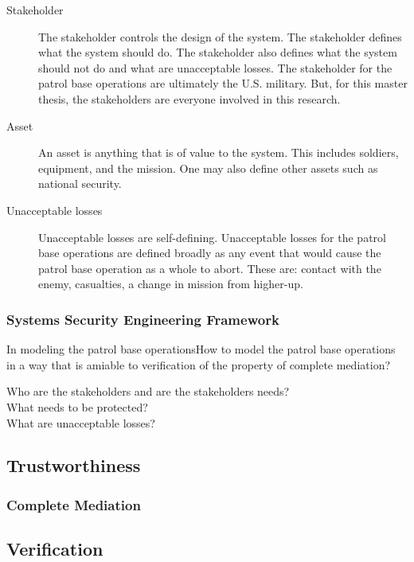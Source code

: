 \documentclass[../../main/main.tex]{subfiles}
\begin{document}
\begin{description}
\item[ Stakeholder]  The stakeholder controls the design of the system.  The stakeholder defines what the system should do.  The stakeholder also defines what the system should not do and what are unacceptable losses.  The stakeholder for the patrol base operations are ultimately the U.S. military.  But, for this master thesis, the stakeholders are everyone involved in this research.  
\item[Asset] An asset is anything that is of value to the system.   This includes soldiers, equipment, and the mission.   One may also define other assets such as national security. 
\item[Unacceptable losses] Unacceptable losses are self-defining.  Unacceptable losses for the patrol base operations are defined broadly as any event that would cause the patrol base operation as a whole to abort.  These are: contact with the enemy, casualties, a change in mission from higher-up.
\end{description}





\subsubsection{Systems Security Engineering Framework}\label{sssec:sseframework}


In modeling the patrol base operationsHow to model the patrol base operations in a way that is amiable to verification of the property of complete mediation?
\begin{description}
\item[Who are the stakeholders and are the stakeholders needs? ]
\item[What needs to be protected?] 
\item[What are unacceptable losses?]
\end{description}


\subsection{Trustworthiness}\label{ssec:trustworthiness}
\subsubsection{Complete Mediation}\label{sssec:completemediation}

\subsection{Verification}\label{ssec:verification}
\end{document}
